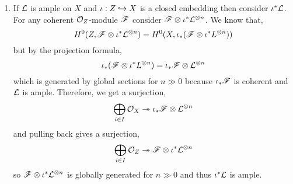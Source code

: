 \documentclass[12pt]{article}
\begin{document}
\begin{enumerate}
\item If $\mathcal{L}$ is ample on $X$ and $\iota : Z \hookrightarrow X$ is a closed embedding then consider $\iota^* \mathcal{L}$. For any coherent $\mathcal{O}_{Z}$-module $\mathscr{F}$ consider $\mathscr{F} \otimes \iota^* \mathcal{L}^{\otimes n}$. We know that,
\[ H^0(Z, \mathscr{F} \otimes \iota^* \mathcal{L}^{\otimes n}) = H^0(X, \iota_* (\mathscr{F} \otimes \iota^* L^{\otimes n})) \]
but by the projection formula,
\[ \iota_* (\mathscr{F} \otimes \iota^* L^{\otimes n}) = \iota_* \mathscr{F} \otimes \mathcal{L}^{\otimes n} \]
which is generated by global sections for $n \gg 0$ because $\iota_* \mathscr{F}$ is coherent and $\mathcal{L}$ is ample. Therefore, we get a surjection,
\[ \bigoplus_{i \in I} \mathcal{O}_{X} \twoheadrightarrow \iota_* \mathscr{F} \otimes \mathcal{L}^{\otimes n} \]
and pulling back gives a surjection,
\[ \bigoplus_{i \in I} \mathcal{O}_{Z} \twoheadrightarrow \mathscr{F} \otimes \iota^* \mathcal{L}^{\otimes n} \]
so $\mathscr{F} \otimes \iota^* \mathcal{L}^{\otimes n}$ is globally generated for $n \gg 0$ and thus $\iota^* \mathcal{L}$ is ample.


\end{enumerate}
\end{document}
